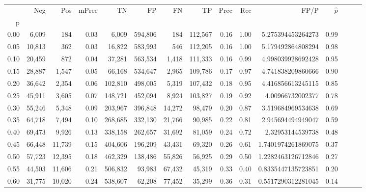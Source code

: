 \begin{tabular}{rrrrrrrrrrrrrrr}
\toprule
{} &     Neg &     Pos & mPrec &       TN &       FP &       FN &       TP &  Prec &   Rec &                  FP/P & $\hat{p}$ \\
p    &         &         &       &          &          &          &          &       &       &                       &           \\
\midrule
0.00 &   6,009 &     184 &  0.03 &    6,009 &  594,806 &      184 &  112,567 &  0.16 &  1.00 &     5.275394453264273 &      0.99 \\
0.05 &  10,813 &     362 &  0.03 &   16,822 &  583,993 &      546 &  112,205 &  0.16 &  1.00 &     5.179492864808294 &      0.98 \\
0.10 &  20,459 &     872 &  0.04 &   37,281 &  563,534 &    1,418 &  111,333 &  0.16 &  0.99 &     4.998039928692428 &      0.95 \\
0.15 &  28,887 &   1,547 &  0.05 &   66,168 &  534,647 &    2,965 &  109,786 &  0.17 &  0.97 &     4.741838209860666 &      0.90 \\
0.20 &  36,642 &   2,354 &  0.06 &  102,810 &  498,005 &    5,319 &  107,432 &  0.18 &  0.95 &     4.416856613245115 &      0.85 \\
0.25 &  45,911 &   3,605 &  0.07 &  148,721 &  452,094 &    8,924 &  103,827 &  0.19 &  0.92 &      4.00966732002377 &      0.78 \\
0.30 &  55,246 &   5,348 &  0.09 &  203,967 &  396,848 &   14,272 &   98,479 &  0.20 &  0.87 &     3.519684969534638 &      0.69 \\
0.35 &  64,718 &   7,494 &  0.10 &  268,685 &  332,130 &   21,766 &   90,985 &  0.22 &  0.81 &     2.945694494949047 &      0.59 \\
0.40 &  69,473 &   9,926 &  0.13 &  338,158 &  262,657 &   31,692 &   81,059 &  0.24 &  0.72 &      2.32953144539738 &      0.48 \\
0.45 &  66,448 &  11,739 &  0.15 &  404,606 &  196,209 &   43,431 &   69,320 &  0.26 &  0.61 &    1.7401974261869075 &      0.37 \\
0.50 &  57,723 &  12,395 &  0.18 &  462,329 &  138,486 &   55,826 &   56,925 &  0.29 &  0.50 &    1.2282463126712846 &      0.27 \\
0.55 &  44,503 &  11,606 &  0.21 &  506,832 &   93,983 &   67,432 &   45,319 &  0.33 &  0.40 &    0.8335447135723851 &      0.20 \\
0.60 &  31,775 &  10,020 &  0.24 &  538,607 &   62,208 &   77,452 &   35,299 &  0.36 &  0.31 &    0.5517290312281045 &      0.14 \\

\end{tabular}

